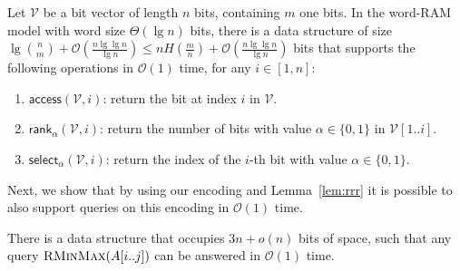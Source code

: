 \documentclass[runningheads]{llncs}
\def\rankop{\textsf{rank}}
\def\selop{\textsf{select}}
\def\accessop{\textsf{access}}
\newcommand{\rminmax}{\textsc{RMinMax}}
\newcommand{\Oh}{\mathcal{O}}
\begin{document}
\begin{lemma}\label{lem:rrr} Let $\mathcal{V}$ be a
  bit vector of length $n$ bits, containing $m$ one bits.  In the
  word-RAM model with word size $\Theta(\lg n)$ bits, there is a data
  structure of size $\lg \binom{n}{m} + \Oh(\frac{n\lg \lg n}{\lg n})
  \le n H(\frac{m}{n}) + \Oh(\frac{n \lg \lg n}{\lg n})$ bits that
  supports the following operations in $\Oh(1)$ time, for any $i \in
  [1,n]$:
\begin{enumerate}
\item $\accessop(\mathcal{V}, i)$: return the bit at index $i$ in $\mathcal{V}$.
\item $\rankop_\alpha(\mathcal{V}, i)$: return the number of bits with
  value $\alpha \in \{0,1\}$ in $\mathcal{V}[1..i]$.
\item $\selop_\alpha(\mathcal{V}, i)$: return the index of the $i$-th
  bit with value $\alpha \in \{0,1\}$.
\end{enumerate}
\end{lemma}

Next, we show that by using our encoding and Lemma~\ref{lem:rrr} it
is possible to also support queries on this encoding in $\Oh(1)$ time.

\begin{theorem}\label{thm:min-max-ub}
There is a data structure that occupies $3n + o(n)$ bits of space,
such that any query $\rminmax(A[i..j])$ can be answered in $\Oh(1)$
time.
\end{theorem}
\end{document}
